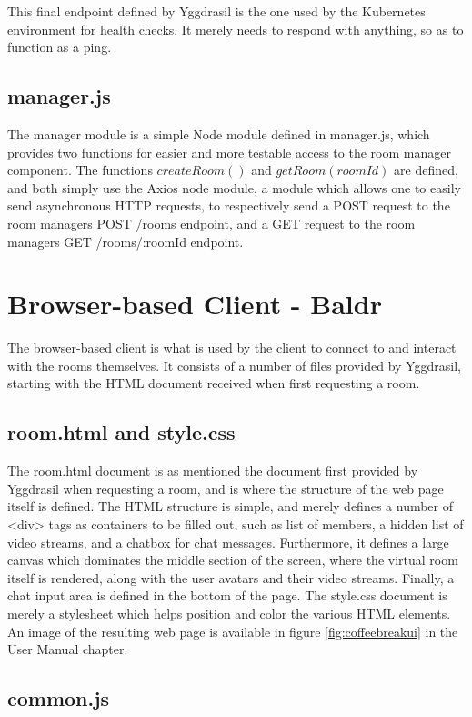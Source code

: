 This final endpoint defined by Yggdrasil is the one used by the Kubernetes environment for health checks. It merely needs to respond with anything, so as to function as a ping.

\subsection{manager.js}

The manager module is a simple Node module defined in manager.js, which provides two functions for easier and more testable access to the room manager component. The functions $createRoom()$ and $getRoom(roomId)$ are defined, and both simply use the Axios node module, a module which allows one to easily send asynchronous HTTP requests, to respectively send a POST request to the room managers POST /rooms endpoint, and a GET request to the room managers GET /rooms/:roomId endpoint.

\section{Browser-based Client - Baldr}

The browser-based client is what is used by the client to connect to and interact with the rooms themselves. It consists of a number of files provided by Yggdrasil, starting with the HTML document received when first requesting a room.

\subsection{room.html and style.css}

The room.html document is as mentioned the document first provided by Yggdrasil when requesting a room, and is where the structure of the web page itself is defined. The HTML structure is simple, and merely defines a number of <div> tags as containers to be filled out, such as list of members, a hidden list of video streams, and a chatbox for chat messages. Furthermore, it defines a large canvas which dominates the middle section of the screen, where the virtual room itself is rendered, along with the user avatars and their video streams. Finally, a chat input area is defined in the bottom of the page. The style.css document is merely a stylesheet which helps position and color the various HTML elements. An image of the resulting web page is available in figure \ref{fig:coffeebreakui} in the User Manual chapter.

\subsection{common.js}

